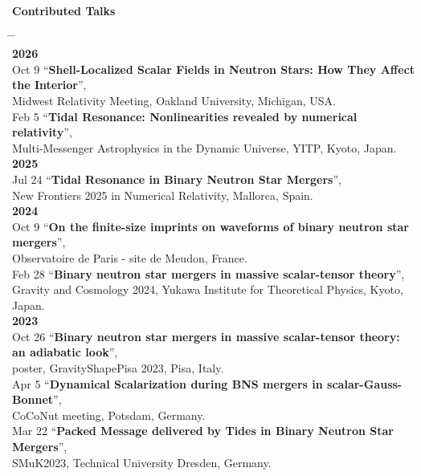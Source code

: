 \documentclass[10pt,floatfix,a4paper]{article}
\newcommand{\hk}[1]{\textcolor{UIUCOrange}{#1}}
\begin{document}
{\large \bf \hk{Contributed Talks}}
\begin{tabbing}
  \hspace*{5mm} \= \hspace*{2cm} \= \hspace*{10cm} \\[-3ex]
  \> \textbf{2026} \> \\[1ex]
  \> Oct 9 \> ``\textbf{Shell-Localized Scalar Fields in Neutron Stars: How They Affect the Interior}'',\\
  \> \> Midwest Relativity Meeting, Oakland University, Michigan, USA.\\
  \> Feb 5 \> ``\textbf{Tidal Resonance: Nonlinearities revealed by numerical relativity}'',\\
  \> \> Multi-Messenger Astrophysics in the Dynamic Universe, YITP, Kyoto, Japan.\\
  \> \textbf{2025} \> \\[1ex]
  \> Jul 24 \> ``\textbf{Tidal Resonance in Binary Neutron Star Mergers}'',\\
  \> \> New Frontiers 2025 in Numerical Relativity, Mallorca, Spain. \\ 
  \> \textbf{2024} \> \\[1ex]
  \> Oct 9 \> ``\textbf{On the finite-size imprints on waveforms of binary neutron star mergers}'',\\
  \> \> Observatoire de Paris - site de Meudon, France. \\  
  \> Feb 28 \> ``\textbf{Binary neutron star mergers in massive scalar-tensor theory}'',\\
  \> \> Gravity and Cosmology 2024, Yukawa Institute for Theoretical Physics, Kyoto, Japan.\\
  \> \textbf{2023} \> \\[1ex]
  \> Oct 26 \> ``\textbf{Binary neutron star mergers in massive scalar-tensor theory: an
  adiabatic look}'', \\
  \> \> poster, GravityShapePisa 2023, Pisa, Italy.\\
  \> Apr 5 \> ``\textbf{Dynamical Scalarization during BNS mergers
  in scalar-Gauss-Bonnet}'', \\
  \> \> CoCoNut meeting, Potsdam, Germany.\\
  \> Mar 22 \> ``\textbf{Packed Message delivered by Tides in
  Binary Neutron Star Mergers}'', \\
  \> \> SMuK2023, Technical University Dresden, Germany.\\

\end{tabbing}
\end{document}
